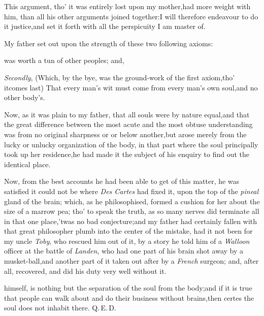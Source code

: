 \documentclass{article}
\begin{document}
This argument, tho’ it was entirely lost upon my
mother,\tsk had more weight with him, than all his other
arguments joined together:\tsk I will therefore endeavour to do
it justice,\tsk and set it forth with all the perspicuity I am
master of.

My father set out upon the strength of these two following
axioms:

\noindent
{}
was worth a tun of other peoples; and,

\textit{Secondly}, (Which, by the bye, was the ground-work of the
first axiom,\tsk tho’ it\break comes last) That every
man’s wit must come from every man’s own
soul,\tsk and no other body’s.

Now, as it was plain to my father, that all souls were by nature
equal,\tsk and that the great difference between the most
acute and the most obtuse understanding
\tsk was from no
original sharpness or\break
{}\break or
below another,\tsk but arose merely from the lucky or
unlucky organization of the body, in that part where the soul
principally took up her residence,\tsh he had made it the
subject of his enquiry to find out the identical place.

Now, from the best accounts he had been able to get of this
matter, he was satisfied it could not be where \textit{Des
Cartes} had fixed it, upon the top of the \textit{pineal}
gland of the brain; which, as he philo\-sophised, formed a cushion
for her about the size of a marrow pea; tho’ to speak the
truth, as so many nerves did terminate all in that one
place,\tsk ’twas no bad conjecture;\tsk and my
father had certainly fallen with that great philosopher plumb into
the center of the mistake, had it not been for my uncle
\textit{Toby}, who rescued him out of it, by a story he told him of a
\textit{Walloon} officer at the battle of \textit{Landen}, who had one
part of his brain shot away by a musket-ball,\tsk and another
part of it taken out after by a \textit{French} surgeon; and, after
all, recovered, and did his duty very well without it.

\break
himself, is nothing but the separation of 
the soul from the body;\tsk and if it is true
that people can walk about and do their business without
brains,\tsk then certes the soul does not inhabit there.
\quad Q.\,E.\,D.
\end{document}
